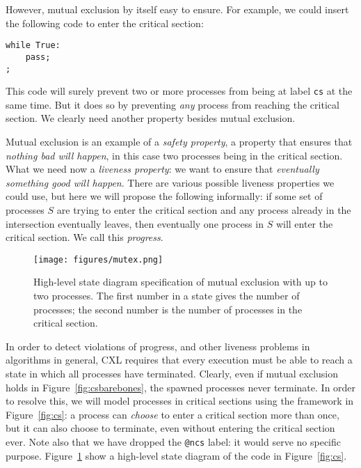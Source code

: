 \documentclass{report}
\newenvironment{code}{
\tcolorbox
}{
\endtcolorbox
}
\begin{document}
However, mutual exclusion by itself easy to ensure.
For example, we could insert the following code to enter the
critical section:
\begin{code}
\begin{verbatim}
while True:
    pass;
;
\end{verbatim}
\end{code}
This code will surely prevent two or more processes from being
at label \texttt{cs} at the same time.
But it does so by preventing \emph{any} process from reaching
the critical section.
We clearly need another property besides mutual exclusion.

Mutual exclusion is an example of a \emph{safety property}, a
property that ensures that \emph{nothing bad will happen}, in this case
two processes being in the critical section.
What we need now a \emph{liveness property}: we want to ensure that
\emph{eventually something good will happen}.
There are various possible liveness properties we could use,
but here we will propose the following informally: if some set of processes
$S$ are trying to enter the critical section and any process already in the
intersection eventually leaves, then eventually one process in $S$ will enter
the critical section.
We call this \emph{progress}.

\begin{figure}
\begin{center}
\texttt{[image: figures/mutex.png]}
\end{center}
\caption{High-level state diagram specification of mutual exclusion with up to two processes.
The first number in a state gives the number of processes; the second number is the
number of processes in the critical section.}
\label{fig:mutex}
\end{figure}

In order to detect violations of progress, and other liveness problems in
algorithms in general, CXL requires that every execution must be
able to reach a state in which all processes have terminated.
Clearly, even if mutual exclusion holds in Figure~\ref{fig:csbarebones},
the spawned processes never terminate.  In order to resolve this, we
will model processes in critical sections using the framework in
Figure~\ref{fig:cs}: a process can \emph{choose} to enter a
critical section more than once, but it can also choose to terminate, even
without entering the critical section ever.
Note also that we have dropped the \texttt{@ncs} label: it would serve no
specific purpose.
Figure~\ref{fig:mutex} show a high-level state diagram of the code in
Figure~\ref{fig:cs}.
\end{document}
